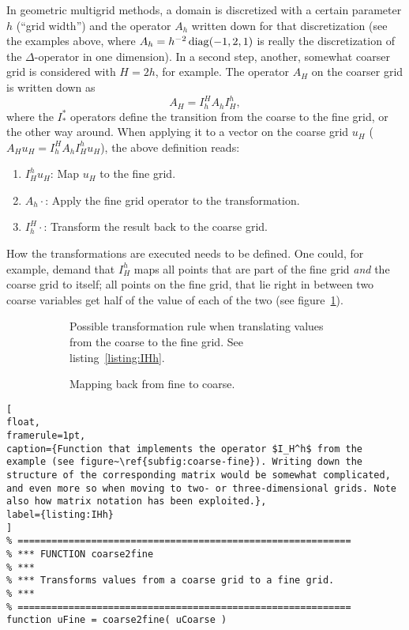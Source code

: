 \begin{example}[Multigrid]
In geometric multigrid methods, a domain is discretized with a certain
parameter $h$ (``grid width'') and the operator $A_h$ written down for that
discretization (see the examples above, where $A_h=h^{-2}\operatorname{diag}(-1,2,1)$ is
really the discretization of the $\Delta$-operator in one dimension). In a
second step, another, somewhat coarser grid is considered with $H=2h$, for
example. The operator $A_H$ on the coarser grid is written down as
\[
A_H = I_h^H A_h I_H^h,
\]
where the $I_*^*$ operators define the transition from the coarse to the fine
grid, or the other way around. When applying it to a vector on the coarse grid
$u_H$ ($A_Hu_H =I_h^H A_h I_H^h u_H$), the above definition reads:
\begin{enumerate}
\item $I_H^h u_H$: Map $u_H$ to the fine grid.
\item $A_h\cdot$: Apply the fine grid operator to the transformation.
\item $I_h^H\cdot$: Transform the result back to the coarse grid.
\end{enumerate}
How the transformations are executed needs to be defined. One could, for
example, demand that $I_H^h$ maps all points that are part of the fine grid
\emph{and} the coarse grid to itself; all points on the fine grid, that lie
right in between two coarse variables get half of the value of each of the two
(see figure~\ref{subfig:coarse-fine}).

\begin{figure}
\centering
\begin{subfigure}{0.45\textwidth}
  
  \caption{Possible transformation rule when translating values from the
  coarse to the fine grid. See listing~\ref{listing:IHh}.}
  \label{subfig:coarse-fine}
\end{subfigure}
\hfill
\begin{subfigure}{0.45\textwidth}
  
  \caption{Mapping back from fine to coarse.}
  \label{subfig:fine-coarse}
\end{subfigure}
\caption{}
\end{figure}


\begin{lstlisting}[
float,
framerule=1pt,
caption={Function that implements the operator $I_H^h$ from the example (see figure~\ref{subfig:coarse-fine}). Writing down the structure of the corresponding matrix would be somewhat complicated, and even more so when moving to two- or three-dimensional grids. Note also how matrix notation has been exploited.},
label={listing:IHh}
]
% ===========================================================
% *** FUNCTION coarse2fine
% ***
% *** Transforms values from a coarse grid to a fine grid.
% ***
% ===========================================================
function uFine = coarse2fine( uCoarse )


\end{lstlisting}
\end{example}
